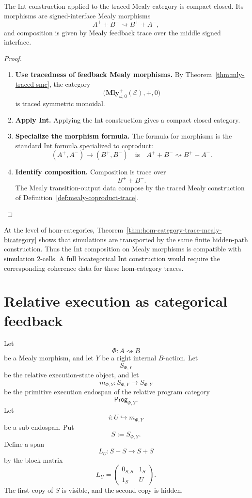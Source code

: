\begin{theorem}
\label{thm:int-feedback-mealy}
The Int construction applied to the traced Mealy category is compact closed.
Its morphisms are signed-interface Mealy morphisms
\[
  A^+ + B^-
  \rightsquigarrow
  B^+ + A^-,
\]
and composition is given by Mealy feedback trace over the middle signed
interface.
\end{theorem}

\begin{proof}
\begin{enumerate}
  \item \textbf{Use tracedness of feedback Mealy morphisms.}
  By Theorem~\ref{thm:mly-traced-smc}, the category
  \[
    \bigl(\mathbf{Mly}^{+}_{\omega,0}(\mathcal E),+,0\bigr)
  \]
  is traced symmetric monoidal.

  \item \textbf{Apply Int.}
  Applying the Int construction gives a compact closed category.

  \item \textbf{Specialize the morphism formula.}
  The formula for morphisms is the standard Int formula specialized to
  coproduct:
  \[
    (A^+,A^-)\to(B^+,B^-)
    \quad\text{is}\quad
    A^+ + B^-\rightsquigarrow B^+ + A^-.
  \]

  \item \textbf{Identify composition.}
  Composition is trace over
  \[
    B^+ + B^-.
  \]
  The Mealy transition-output data compose by the traced Mealy construction of
  Definition~\ref{def:mealy-coproduct-trace}.
\end{enumerate}
\end{proof}

At the level of hom-categories,
Theorem~\ref{thm:hom-category-trace-mealy-bicategory} shows that simulations
are transported by the same finite hidden-path construction. Thus the Int
composition on Mealy morphisms is compatible with simulation 2-cells. A full
bicategorical Int construction would require the corresponding coherence data
for these hom-category traces.

\section{Relative execution as categorical feedback}
\label{sec:relative-execution-as-feedback}

Let
\[
  \Phi:A\rightsquigarrow B
\]
be a Mealy morphism, and let \(Y\) be a right internal \(B\)-action. Let
\[
  S_{\Phi,Y}
\]
be the relative execution-state object, and let
\[
  m_{\Phi,Y}:S_{\Phi,Y}\to S_{\Phi,Y}
\]
be the primitive execution endospan of the relative program category
\[
  \mathsf{Prog}_{\Phi,Y}.
\]
Let
\[
  i:U\hookrightarrow m_{\Phi,Y}
\]
be a sub-endospan. Put
\[
  S:=S_{\Phi,Y}.
\]
Define a span
\[
  L_U:S+S\to S+S
\]
by the block matrix
\[
  L_U=
  \begin{pmatrix}
    0_{S,S} & 1_S\\
    1_S & U
  \end{pmatrix}.
\]
The first copy of \(S\) is visible, and the second copy is hidden.

